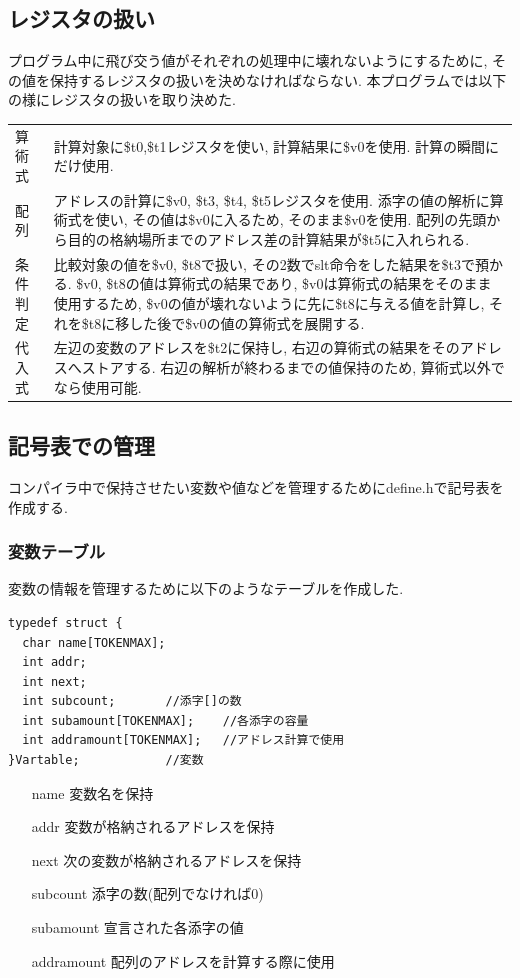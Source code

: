 \documentclass[a4j]{jarticle}
\begin{document}
\subsection{レジスタの扱い}
プログラム中に飛び交う値がそれぞれの処理中に壊れないようにするために, その値を保持するレジスタの扱いを決めなければならない. 本プログラムでは以下の様にレジスタの扱いを取り決めた.
\begin{table}[htb]
  \begin{tabular}{lp{13cm}}
    算術式  & 計算対象に\$t0,\$t1レジスタを使い, 計算結果に\$v0を使用. 計算の瞬間にだけ使用.\\
    配列 & アドレスの計算に\$v0, \$t3, \$t4, \$t5レジスタを使用. 添字の値の解析に算術式を使い, その値は\$v0に入るため, そのまま\$v0を使用. 配列の先頭から目的の格納場所までのアドレス差の計算結果が\$t5に入れられる.\\
    条件判定 & 比較対象の値を\$v0, \$t8で扱い, その2数でslt命令をした結果を\$t3で預かる. \$v0, \$t8の値は算術式の結果であり, \$v0は算術式の結果をそのまま使用するため, \$v0の値が壊れないように先に\$t8に与える値を計算し, それを\$t8に移した後で\$v0の値の算術式を展開する.\\
    代入式 & 左辺の変数のアドレスを\$t2に保持し, 右辺の算術式の結果をそのアドレスへストアする. 右辺の解析が終わるまでの値保持のため, 算術式以外でなら使用可能. 
  \end{tabular}
\end{table}

\subsection{記号表での管理}
コンパイラ中で保持させたい変数や値などを管理するためにdefine.hで記号表を作成する. 

\subsubsection{変数テーブル}
変数の情報を管理するために以下のようなテーブルを作成した.
\begin{verbatim}
typedef struct {
  char name[TOKENMAX];
  int addr;
  int next;
  int subcount;       //添字[]の数
  int subamount[TOKENMAX];    //各添字の容量
  int addramount[TOKENMAX];   //アドレス計算で使用
}Vartable;            //変数
\end{verbatim}
\begin{itemize}
\item [name] 変数名を保持
\item [addr] 変数が格納されるアドレスを保持
\item [next] 次の変数が格納されるアドレスを保持
\item [subcount] 添字の数(配列でなければ0)
\item [subamount] 宣言された各添字の値
\item [addramount] 配列のアドレスを計算する際に使用
\end{itemize}
\end{document}
